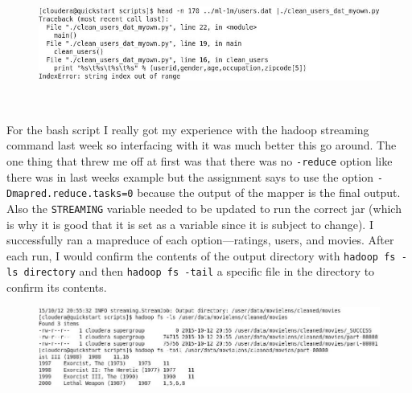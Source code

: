 \documentclass[10pt]{article}
\begin{document}
\begin{figure}[!h]
\includegraphics[scale=0.37]{clean_users_error1.jpg}
\centering
\end{figure}\\
\par For the bash script I really got my experience with the hadoop streaming command last week so interfacing with it was much better this go around. The one thing that threw me off at first was that there was no \verb|-reduce| option like there was in last weeks example but the assignment says to use the option \verb|-Dmapred.reduce.tasks=0| because the output of the mapper is the final output. Also the \verb|STREAMING| variable needed to be updated to run the correct jar (which is why it is good that it is set as a variable since it is subject to change). I successfully ran a mapreduce of each option—ratings, users, and movies. After each run, I would confirm the contents of the output directory with \verb|hadoop fs -ls directory| and then \verb|hadoop fs -tail| a specific file in the directory to confirm its contents.
\begin{figure}[!h]
\includegraphics[scale=0.45]{mapreduce_movies_check.jpg}
\centering
\end{figure}
\end{document}
